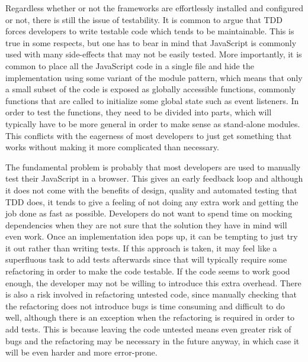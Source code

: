 \documentclass[11pt]{article}
\begin{document}
Regardless whether or not the frameworks are effortlessly installed and configured or not, there is still the issue of testability. It is common to argue that TDD forces developers to write testable code which tends to be maintainable. This is true in some respects, but one has to bear in mind that JavaScript is commonly used with many side-effects that may not be easily tested. More importantly, it is common to place all the JavaScript code in a single file and hide the implementation using some variant of the module pattern\cite[p.~40]{GoodParts}, which means that only a small subset of the code is exposed as globally accessible functions, commonly functions that are called to initialize some global state such as event listeners. In order to test the functions, they need to be divided into parts, which will typically have to be more general in order to make sense as stand-alone modules. This conflicts with the eagerness of most developers to just get something that works without making it more complicated than necessary.

The fundamental problem is probably that most developers are used to manually test their JavaScript in a browser. This gives an early feedback loop and although it does not come with the benefits of design, quality and automated testing that TDD does, it tends to give a feeling of not doing any extra work and getting the job done as fast as possible. Developers do not want to spend time on mocking dependencies when they are not sure that the solution they have in mind will even work. Once an implementation idea pops up, it can be tempting to just try it out rather than writing tests. If this approach is taken, it may feel like a superfluous task to add tests afterwards since that will typically require some refactoring in order to make the code testable. If the code seems to work good enough, the developer may not be willing to introduce this extra overhead. There is also a risk involved in refactoring untested code\cite[p.~17]{Refactoring}, since manually checking that the refactoring does not introduce bugs is time consuming and difficult to do well, although there is an exception when the refactoring is required in order to add tests. This is because leaving the code untested means even greater risk of bugs and the refactoring may be necessary in the future anyway, in which case it will be even harder and more error-prone.

\nocite{Tddjs}
\printbibliography
\end{document}
